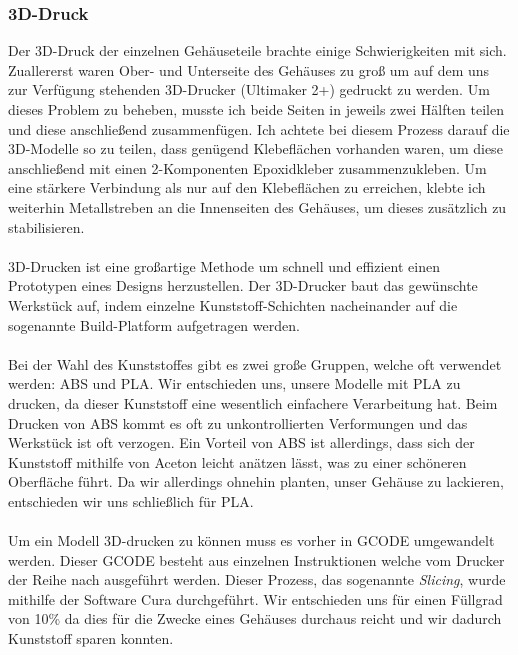 
\subsubsection{3D-Druck}

Der 3D-Druck der einzelnen Gehäuseteile brachte einige Schwierigkeiten mit sich. Zuallererst waren Ober- und Unterseite des Gehäuses zu groß um auf dem uns zur Verfügung stehenden 3D-Drucker (Ultimaker 2+) gedruckt zu werden. Um dieses Problem zu beheben, musste ich beide Seiten in jeweils zwei Hälften teilen und diese anschließend zusammenfügen. Ich achtete bei diesem Prozess darauf die 3D-Modelle so zu teilen, dass genügend Klebeflächen vorhanden waren, um diese anschließend mit einen 2-Komponenten Epoxidkleber zusammenzukleben. Um eine stärkere Verbindung als nur auf den Klebeflächen zu erreichen, klebte ich weiterhin Metallstreben an die Innenseiten des Gehäuses, um dieses zusätzlich zu stabilisieren.\\
\\
3D-Drucken ist eine großartige Methode um schnell und effizient einen Prototypen eines Designs herzustellen. Der 3D-Drucker baut das gewünschte Werkstück auf, indem einzelne Kunststoff-Schichten nacheinander auf die sogenannte Build-Platform aufgetragen werden.\\
\\
Bei der Wahl des Kunststoffes gibt es zwei große Gruppen, welche oft verwendet werden: ABS und PLA. Wir entschieden uns, unsere Modelle mit PLA zu drucken, da dieser Kunststoff eine wesentlich einfachere Verarbeitung hat. Beim Drucken von ABS kommt es oft zu unkontrollierten Verformungen und das Werkstück ist oft verzogen. Ein Vorteil von ABS ist allerdings, dass sich der Kunststoff mithilfe von Aceton leicht anätzen lässt, was zu einer schöneren Oberfläche führt. Da wir allerdings ohnehin planten, unser Gehäuse zu lackieren, entschieden wir uns schließlich für PLA.\\
\\
Um ein Modell 3D-drucken zu können muss es vorher in GCODE umgewandelt werden. Dieser GCODE besteht aus einzelnen Instruktionen welche vom Drucker der Reihe nach ausgeführt werden. Dieser Prozess, das sogenannte \textit{Slicing}, wurde mithilfe der Software Cura durchgeführt. Wir entschieden uns für einen Füllgrad von 10\% da dies für die Zwecke eines Gehäuses durchaus reicht und wir dadurch Kunststoff sparen konnten.\\